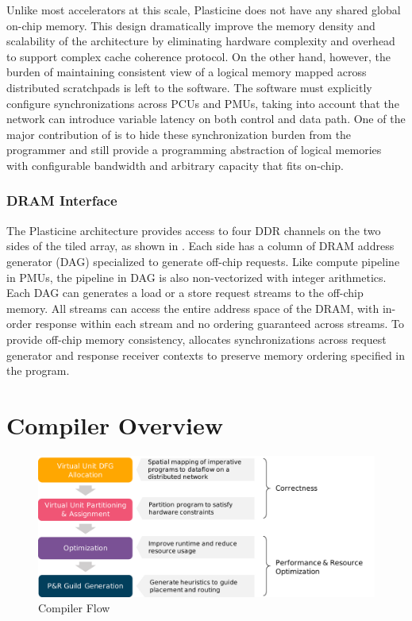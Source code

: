 Unlike most accelerators at this scale, Plasticine does not have any shared global on-chip memory. 
This design dramatically improve the memory density and scalability of the architecture 
by eliminating hardware complexity and overhead to support complex cache coherence protocol.
On the other hand, however, the burden of maintaining consistent view of a logical memory mapped
across distributed scratchpads is left to the software.
The software must explicitly configure synchronizations across PCUs and PMUs, taking into account
that the network can introduce variable latency on both control and data path.
One of the major contribution of \name is to hide these synchronization burden from the programmer
and still provide a programming abstraction of logical memories with configurable bandwidth and 
arbitrary capacity that fits on-chip.

\subsubsection{DRAM Interface}
The Plasticine architecture provides access to four DDR channels on the two sides of the
tiled array, as shown in . 
Each side has a column of DRAM address generator (DAG) specialized to generate off-chip
requests. Like compute pipeline in PMUs, the pipeline in DAG is also non-vectorized with integer
arithmetics. Each DAG can generates a load or a store request streams to the off-chip memory. All
streams can access the entire address space of the DRAM, with in-order response within each stream
and no ordering guaranteed across streams. To provide off-chip memory consistency, \name allocates
synchronizations across request generator and response receiver contexts to preserve memory ordering
specified in the program.

\section{Compiler Overview}

\begin{figure}
\centering
\includegraphics[width=1\textwidth]{figs/sarastack.pdf}
\caption[\name Compiler Flow]{\name Compiler Flow}
\label{fig:flow}
\end{figure}
 
